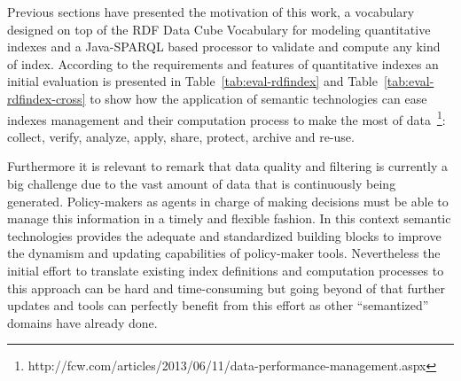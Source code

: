 Previous sections have presented the motivation of this work, a vocabulary designed on top of the 
RDF Data Cube Vocabulary for modeling quantitative indexes and a Java-SPARQL based processor 
to validate and compute any kind of index. According to the requirements and features 
of quantitative indexes an initial evaluation is presented in Table~\ref{tab:eval-rdfindex} and Table~\ref{tab:eval-rdfindex-cross} 
to show how the application of semantic technologies can ease indexes management and their computation process 
to make the most of data~\footnote{http://fcw.com/articles/2013/06/11/data-performance-management.aspx}: 
collect, verify, analyze, apply, share, protect, archive and re-use.

Furthermore it is relevant to remark that data quality and filtering is currently a big challenge 
due to the vast amount of data that is continuously being generated. Policy-makers as agents in charge 
of making decisions must be able to manage this information in a timely and flexible fashion. In this context semantic technologies provides the adequate and standardized building blocks to improve the dynamism and updating capabilities of policy-maker tools. Nevertheless 
the initial effort to translate existing index definitions and computation processes to this approach can 
be hard and time-consuming but going beyond of that further updates and tools can perfectly benefit from this effort as 
other ``semantized'' domains have already done.

